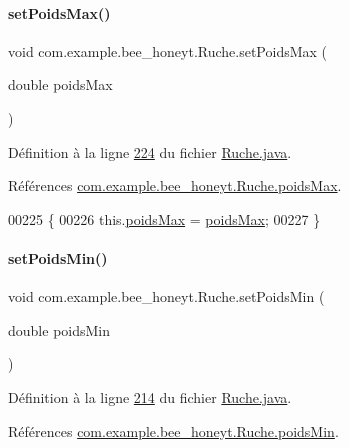 \paragraph{\texorpdfstring{set\+Poids\+Max()}{setPoidsMax()}}
{\footnotesize\ttfamily void com.\+example.\+bee\+\_\+honeyt.\+Ruche.\+set\+Poids\+Max (\begin{DoxyParamCaption}\item[{double}]{poids\+Max }\end{DoxyParamCaption})}



Définition à la ligne \hyperlink{_ruche_8java_source_l00224}{224} du fichier \hyperlink{_ruche_8java_source}{Ruche.\+java}.



Références \hyperlink{_ruche_8java_source_l00034}{com.\+example.\+bee\+\_\+honeyt.\+Ruche.\+poids\+Max}.


\begin{DoxyCode}
00225     \{
00226         this.\hyperlink{classcom_1_1example_1_1bee__honeyt_1_1_ruche_a5901bf432f6d2de0e5facb8952277cbc}{poidsMax} = \hyperlink{classcom_1_1example_1_1bee__honeyt_1_1_ruche_a5901bf432f6d2de0e5facb8952277cbc}{poidsMax};
00227     \}
\end{DoxyCode}
\mbox{\label{classcom_1_1example_1_1bee__honeyt_1_1_ruche_aace243242d173adf82592342fecc1328}} 
\paragraph{\texorpdfstring{set\+Poids\+Min()}{setPoidsMin()}}
{\footnotesize\ttfamily void com.\+example.\+bee\+\_\+honeyt.\+Ruche.\+set\+Poids\+Min (\begin{DoxyParamCaption}\item[{double}]{poids\+Min }\end{DoxyParamCaption})}



Définition à la ligne \hyperlink{_ruche_8java_source_l00214}{214} du fichier \hyperlink{_ruche_8java_source}{Ruche.\+java}.



Références \hyperlink{_ruche_8java_source_l00033}{com.\+example.\+bee\+\_\+honeyt.\+Ruche.\+poids\+Min}.


